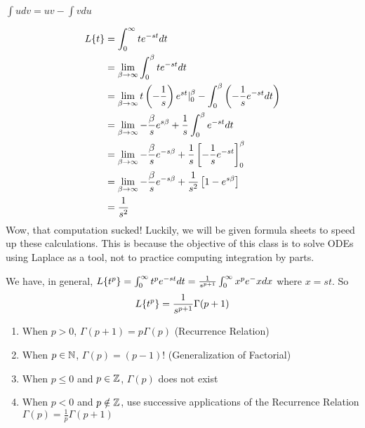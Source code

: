 \begin{example}
    \begin{recall}
        $\int udv = uv - \int vdu$
    \end{recall}

    \begin{align*}
        L\{t\} &= \int_0^\infty t e^{-st} dt \\
        &= \lim_{\beta \to \infty} \int_{0}^{\beta} te^{-st} dt \\
        &= \lim_{\beta \to \infty} t\left(-\frac{1}{s}\right) e^{st} |_0^\beta - \int_0^\beta \left(-\frac{1}{s} e^{-st} dt\right) \\
        &= \lim_{\beta \to \infty} -\frac{\beta}{s}e^{s\beta} + \frac{1}{s} \int_0^\beta e^{-st} dt \\
        &= \lim_{\beta \to \infty} -\frac{\beta}{s} e^{-s\beta} + \frac{1}{s} \left[-\frac{1}{s} e^{-st}\right]_0^\beta \\
        &= \lim_{\beta \to \infty} -\frac{\beta}{s} e^{-s\beta} + \frac{1}{s^2}\left[1 - e^{s\beta}\right] \\
        &= \frac{1}{s^2}
    \end{align*}
    Wow, that computation sucked! Luckily, we will be given formula sheets to speed up these calculations. This is because the objective of this class is to solve ODEs using Laplace as a tool, not to practice computing integration by parts.
\end{example}

\begin{theorem}
    We have, in general, $L\{t^p\} = \int_0^\infty t^p e^{-st} dt = \frac{1}{s^{p+1}} \int_0^\infty x^p e^-x dx$ where $x = st$. 
    So $$L\{t^p\} = \frac{1}{s^{p+1}} \Gamma (p+1)$$ 
\end{theorem}

\begin{theorem}
    \spacebeforelist
    \begin{enumerate}
        \item When $p > 0$, $\Gamma (p+1) = p\Gamma(p)$ (Recurrence Relation)
        \item When $p \in \mathbb{N}$, $\Gamma(p) = (p-1)!$ (Generalization of Factorial)
        \item When $p \leq 0$ and $p \in \mathbb{Z}$, $\Gamma(p)$ does not exist
        \item When $p < 0$ and $p \notin \mathbb{Z}$, use successive applications of the Recurrence Relation $\Gamma(p) = \frac{1}{p} \Gamma (p + 1)$
    \end{enumerate}
\end{theorem}